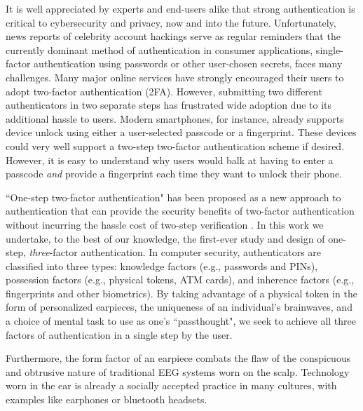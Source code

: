 \documentclass[a4paper,twoside]{article}
\begin{document}
\noindent It is well appreciated by experts and end-users alike that strong authentication is
critical to cybersecurity and privacy, now and into the future. Unfortunately,
news reports of celebrity account hackings serve as regular reminders that
the currently dominant method of authentication in consumer applications, 
single-factor authentication using passwords or other user-chosen secrets, 
faces many challenges. Many major online services have strongly encouraged 
their users to adopt two-factor authentication (2FA). However, submitting two 
different authenticators in two separate steps has frustrated wide adoption
due to its additional hassle to users. Modern smartphones, for instance,
already supports device unlock using either a user-selected passcode or a fingerprint. These
devices could very well support a two-step two-factor authentication scheme if
desired. However, it is easy to understand why users would balk at having to
enter a passcode \emph{and} provide a fingerprint each time they want to unlock their phone.

``One-step two-factor authentication" has been proposed as a new approach
to authentication that can provide the security benefits of two-factor authentication 
without incurring the hassle cost of two-step verification \cite{Chuang2014}.
In this work we undertake, to the best of our knowledge, the first-ever study and design of 
one-step, \textit{three}-factor authentication. %
In computer security, authenticators are 
classified into three types: knowledge factors (e.g., passwords 
and PINs), possession factors (e.g., physical tokens, ATM cards), and inherence
factors (e.g., fingerprints and other biometrics). By taking advantage of a physical token 
in the form of personalized earpieces, the uniqueness of an individual's brainwaves, and
a choice of mental task to use as one's ``passthought", we seek to achieve all three factors 
of authentication in a single step by the user.

Furthermore, the form factor of an earpiece combats the flaw of the conspicuous and 
obtrusive nature of traditional EEG systems worn on the scalp. Technology worn in the 
ear is already a socially accepted practice in many cultures, with examples like 
earphones or bluetooth headsets.
\end{document}
